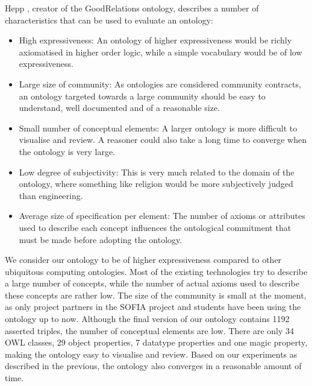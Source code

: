 Hepp \cite{Hepp2007}, creator of the GoodRelations ontology, describes a number of characteristics that can be used to evaluate an ontology:

\begin{itemize}
	\item High expressiveness: An ontology of higher expressiveness would be richly axiomatised in higher order logic, while a simple vocabulary would be of low expressiveness.
	\item Large size of community: As ontologies are considered community contracts,  an ontology targeted towards a large community should be easy to understand, well doc\-u\-ment\-ed and of a reasonable size.
	\item Small number of conceptual elements: A larger ontology is more difficult to visualise and review. A reasoner could also take a long time to converge when the ontology is very large.
	\item Low degree of subjectivity: This is very much related to the domain of the ontology, where something like religion would be more subjectively judged than engineering.
	\item Average size of specification per element: The number of axioms or attributes used to describe each concept influences the ontological commitment\label{OntologicalCommitment} that must be made before adopting the ontology. %
\end{itemize}

We consider our ontology to be of higher expressiveness compared to other ubiquitous computing ontologies. Most of the existing technologies try to describe a large number of concepts, while the number of actual axioms used to describe these concepts are rather low. The size of the community is small at the moment, as only project partners in the \ac{SOFIA} project and students have been using the ontology up to now. Although the final version of our ontology contains 1192 asserted triples, the number of conceptual elements are low. There are only 34 \ac{OWL} classes, 29 object properties, 7 datatype properties and one magic property, making the ontology easy to visualise and review. Based on our experiments as described in the previous, the ontology also converges in a reasonable amount of time.

